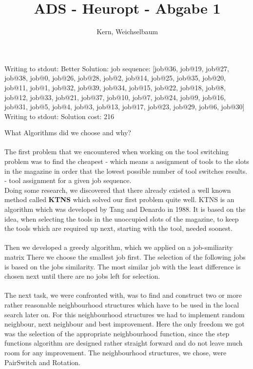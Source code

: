 \documentclass[12pt]{article}
\title{ADS - Heuropt - Abgabe 1}
\author{Kern, Weichselbaum}
\begin{document}
	
\maketitle

Writing to stdout: Better Solution: job sequence: [job@36, job@19, job@27, job@38, job@0, job@26, job@28, job@2, job@14, job@25, job@35, job@20, job@11, job@1, job@32, job@39, job@34, job@15, job@22, job@18, job@8, job@12, job@33, job@21, job@37, job@10, job@7, job@24, job@9, job@16, job@31, job@5, job@4, job@3, job@13, job@17, job@23, job@29, job@6, job@30]
Writing to stdout: Solution cost: 216

What Algorithms did we choose and why?
\\
\\
The first problem that we encountered when working on the tool switching problem
was to find the cheapest - which means a assignment of tools to the slots in the 
magazine in order that the lowest possible number of tool switches results. -
tool assignment for a given job sequence. 
\\
Doing some research, we discovered that
there already existed a well known method called \textbf{KTNS} which solved our first 
problem quite well. KTNS is an algorithm which was developed by Tang and Denardo
in 1988. It is based on the idea, when selecting the tools in the unoccupied slots 
of the magazine, to keep the tools which are required up next, starting with the
tool, needed soonest. 
\\
\\
Then we developed a greedy algorithm, which we applied on a job-smiliarity matrix
There we choose the smallest job first. The selection of the following jobs is 
based on the jobs similarity. The most similar job with the least difference is 
chosen next until there are no jobs left for selection.
\\
\\
The next task, we were confronted with, was to find and construct two or more 
rather reasonable neighbourhood structures which have to be used in the local search
later on. For this neighbourhood structures we had to implement random neighbour, 
next neighbour and best improvement. Here the only freedom we got was the selection
of the appropriate neighbourhood function, since the step functions algorithm are 
designed rather straight forward and do not leave much room for any improvement. 
The neighbourhood structures, we chose, were PairSwitch and Rotation.
\\
\\
\end{document}
